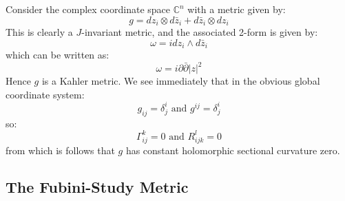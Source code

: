 \documentclass[11pt]{amsart}
\theoremstyle{definition}
\def \C{ \mathbb{C} }
\def \del{ \partial }
\def \delbar{ \bar{\partial} }
\begin{document}
Consider the complex coordinate space $\C^n$ with a metric given by:
%
$$ g = d z_i \otimes d \bar{z}_i + d \bar{z}_i \otimes d z_i $$
%
This is clearly a $J$-invariant metric, and the associated 2-form is given by:
%
$$ \omega = i d z_i \wedge d \bar{z}_i $$
%
which can be written as:
%
$$ \omega = i \del \delbar |z|^2 $$
%
Hence $g$ is a Kahler metric.  We see immediately that in the obvious global coordinate system:
%
$$ g_{ij} = \delta^i_j \text{ and } g^{ij} = \delta^i_j $$
%
so:
%
$$ \Gamma_{ij}^k = 0 \text{ and } R_{ijk}^l = 0 $$
%
from which is follows that $g$ has constant holomorphic sectional curvature zero.


\subsection{The Fubini-Study Metric}
\end{document}
